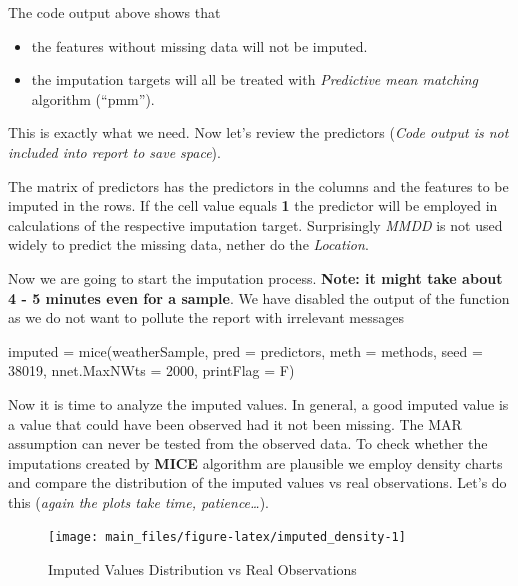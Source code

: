 The code output above shows that

\begin{itemize}
\tightlist
\item
  the features without missing data will not be imputed.
\item
  the imputation targets will all be treated with \emph{Predictive mean
  matching} algorithm (``pmm'').
\end{itemize}

This is exactly what we need. Now let's review the predictors
(\emph{Code output is not included into report to save space}).

The matrix of predictors has the predictors in the columns and the
features to be imputed in the rows. If the cell value equals \textbf{1}
the predictor will be employed in calculations of the respective
imputation target. Surprisingly \emph{MMDD} is not used widely to
predict the missing data, nether do the \emph{Location}.

Now we are going to start the imputation process. \textbf{Note: it might
take about 4 - 5 minutes even for a sample}. We have disabled the output
of the function as we do not want to pollute the report with irrelevant
messages

\begin{Schunk}
\begin{Sinput}
imputed = mice(weatherSample, pred = predictors, meth = methods, seed = 38019,
               nnet.MaxNWts = 2000, printFlag = F)
\end{Sinput}
\end{Schunk}

Now it is time to analyze the imputed values. In general, a good imputed
value is a value that could have been observed had it not been missing.
The MAR assumption can never be tested from the observed data. To check
whether the imputations created by \textbf{MICE} algorithm are plausible
we employ density charts and compare the distribution of the imputed
values vs real observations. Let's do this (\emph{again the plots take
time, patience\ldots{}}).

\begin{Schunk}
\begin{figure}[H]

{\centering \texttt{[image: main\_files/figure-latex/imputed\_density-1]} 

}

\caption[Imputed Values Distribution vs Real Observations]{Imputed Values Distribution vs Real Observations}\label{fig:imputed_density}
\end{figure}
\end{Schunk}

